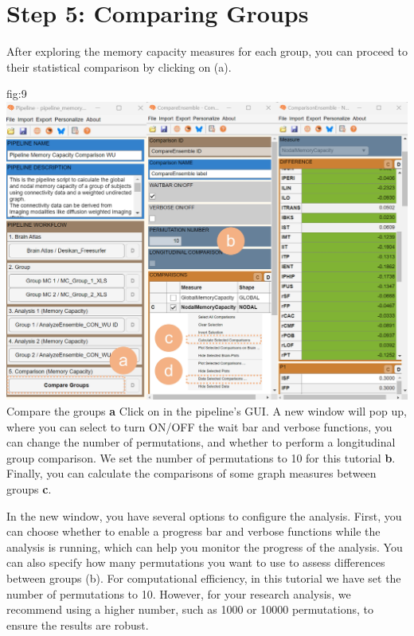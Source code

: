 \documentclass[justified]{tufte-handout}
\begin{document}


\clearpage
\section{Step 5: Comparing Groups}

After exploring the memory capacity measures for each group, you can proceed to their statistical comparison by clicking on  (a).

{fig:9}
{
	\includegraphics{fig09.jpg}
}
{Compare the groups}
{
	{\bf a} Click on  in the pipeline's GUI. A new window will pop up, where you can select to turn ON/OFF the wait bar and verbose functions, you can change the number of permutations, and whether to perform a longitudinal group comparison. We set the number of permutations to 10 for this tutorial {\bf b}. Finally, you can calculate the comparisons of some graph measures between groups {\bf c}.
}


In the new window, you have several options to configure the analysis. First, you can choose whether to enable a progress bar and verbose functions while the analysis is running, which can help you monitor the progress of the analysis. You can also specify how many permutations you want to use to assess differences between groups (b). For computational efficiency, in this tutorial we have set the number of permutations to 10. However, for your research analysis, we recommend using a higher number, such as 1000 or 10000 permutations, to ensure the results are robust.
\end{document}

